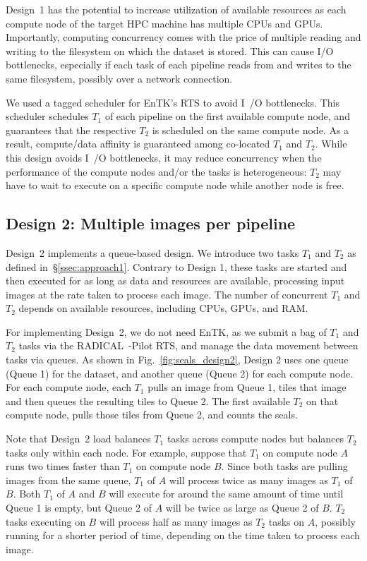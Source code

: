 Design~1 has the potential to increase utilization of available resources as
each compute node of the target HPC machine has multiple CPUs and GPUs.
Importantly, computing concurrency comes with the price of multiple reading
and writing to the filesystem on which the dataset is stored. This can cause
I/O bottlenecks, especially if each task of each pipeline reads from and
writes to the same filesystem, possibly over a network connection.

We used a tagged scheduler for EnTK's RTS to avoid I~/O bottlenecks. This
scheduler schedules $T_{1}$ of each pipeline on the first available compute
node, and guarantees that the respective $T_{2}$ is scheduled on the same
compute node. As a result, compute/data affinity is guaranteed among
co-located $T_{1}$ and $T_{2}$. While this design avoids I~/O bottlenecks, it
may reduce concurrency when the performance of the compute nodes and/or the
tasks is heterogeneous: $T_{2}$ may have to wait to execute on a specific
compute node while another node is free.


\subsection{Design 2: Multiple images per pipeline}
\label{ssec:approach2}

Design~2 implements a queue-based design. We introduce two tasks $T_{1}$ and
$T_{2}$ as defined in~\S\ref{ssec:approach1}. Contrary to Design 1, these
tasks are started and then executed for as long as data and resources are
available, processing input images at the rate taken to process each image.
The number of concurrent $T_{1}$ and $T_{2}$ depends on available resources,
including CPUs, GPUs, and RAM.

For implementing Design~2, we do not need EnTK, as we submit a bag of $T_{1}$
and $T_{2}$ tasks via the RADICAL~-Pilot RTS, and manage the data movement
between tasks via queues. As shown in Fig.~\ref{fig:seals_design2}, Design 2
uses one queue (Queue 1) for the dataset, and another queue (Queue 2) for each
compute node. For each compute node, each $T_{1}$ pulls an image from Queue 1,
tiles that image and then queues the resulting tiles to Queue 2. The first
available $T_{2}$ on that compute node, pulls those tiles from Queue 2, and
counts the seals.

Note that Design~2 load balances $T_{1}$ tasks across compute nodes but
balances $T_{2}$ tasks only within each node. For example, suppose that
$T_{1}$ on compute node $A$ runs two times faster than $T_{1}$ on compute node
$B$. Since both tasks are pulling images from the same queue, $T_{1}$ of $A$
will process twice as many images as $T_{1}$ of $B$. Both $T_{1}$ of $A$ and
$B$ will execute for around the same amount of time until Queue 1 is empty,
but Queue 2 of $A$ will be twice as large as Queue 2 of $B$. $T_{2}$ tasks
executing on $B$ will process half as many images as $T_{2}$ tasks on $A$,
possibly running for a shorter period of time, depending on the time taken to
process each image.

